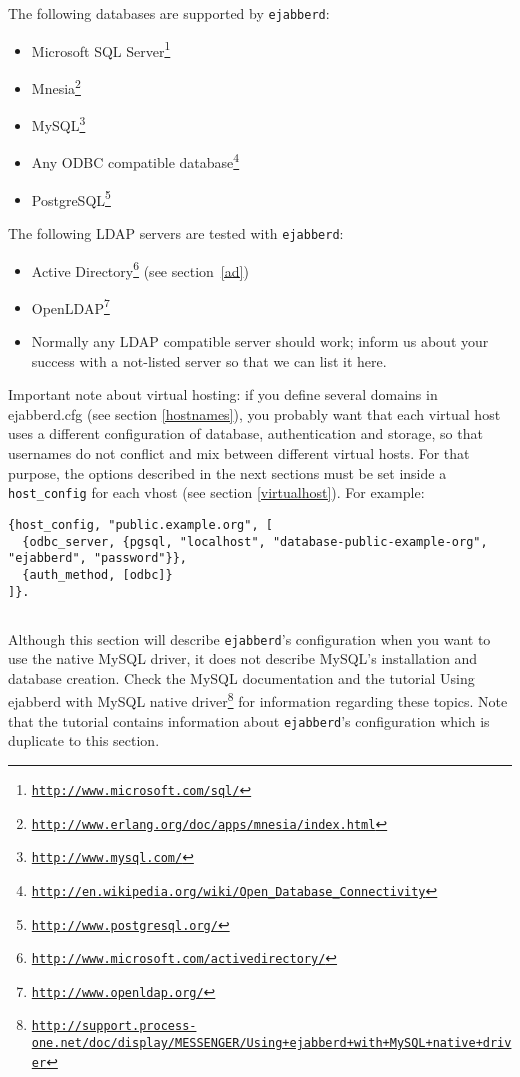 \documentclass[a4paper,10pt]{book}
\newcommand{\ind}[1]{\begin{latexonly}\index{#1}\end{latexonly}}
\newcommand{\makesubsection}[2]{ \aname{#1}{} \subsection{\ahrefloc{#1}{#2}} \label{#1} }
\newcommand{\term}[1]{\texttt{#1}}
\newcommand{\ejabberd}{\texttt{ejabberd}}
\gdef\footahref#1#2{#2\footnote{\href{#1}{\texttt{#1}}}}
\begin{document}
The following databases are supported by \ejabberd{}:
\begin{itemize}
\item \footahref{http://www.microsoft.com/sql/}{Microsoft SQL Server}
\item \footahref{http://www.erlang.org/doc/apps/mnesia/index.html}{Mnesia}
\item \footahref{http://www.mysql.com/}{MySQL}
\item \footahref{http://en.wikipedia.org/wiki/Open\_Database\_Connectivity}{Any ODBC compatible database}
\item \footahref{http://www.postgresql.org/}{PostgreSQL}
\end{itemize}

The following LDAP servers are tested with \ejabberd{}:
\begin{itemize}
\item \footahref{http://www.microsoft.com/activedirectory/}{Active Directory}
  (see section~\ref{ad})
\item \footahref{http://www.openldap.org/}{OpenLDAP}
\item Normally any LDAP compatible server should work; inform us about your
  success with a not-listed server so that we can list it here.
\end{itemize}

Important note about virtual hosting:
if you define several domains in ejabberd.cfg (see section \ref{hostnames}),
you probably want that each virtual host uses a different configuration of database, authentication and storage,
so that usernames do not conflict and mix between different virtual hosts.
For that purpose, the options described in the next sections
must be set inside a \term{host\_config} for each vhost (see section \ref{virtualhost}).
For example:
\begin{verbatim}
{host_config, "public.example.org", [
  {odbc_server, {pgsql, "localhost", "database-public-example-org", "ejabberd", "password"}},
  {auth_method, [odbc]}
]}.
\end{verbatim}


\makesubsection{mysql}{MySQL}
\ind{MySQL}\ind{MySQL!schema}

Although this section will describe \ejabberd{}'s configuration when you want to
use the native MySQL driver, it does not describe MySQL's installation and
database creation. Check the MySQL documentation and the tutorial \footahref{http://support.process-one.net/doc/display/MESSENGER/Using+ejabberd+with+MySQL+native+driver}{Using ejabberd with MySQL native driver} for information regarding these topics.
Note that the tutorial contains information about \ejabberd{}'s configuration
which is duplicate to this section.
\end{document}
